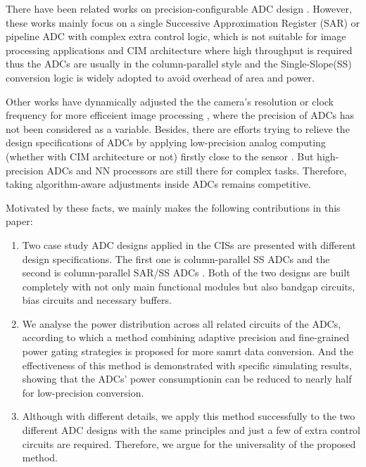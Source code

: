 \documentclass[conference]{IEEEtran}
\begin{document}

There have been related works on precision-configurable ADC design \cite{xia_10-bit_2006}\cite{zhu_06_2013}\cite{zhu_6--10-bit_2015}. However, these works mainly focus on a single Successive Approximation Register (SAR) or pipeline ADC with complex extra control logic,
which is not suitable for image processing applications and CIM architecture where high throughput is required thus the ADCs are usually in the column-parallel style and the Single-Slope(SS)
conversion logic is widely adopted to avoid overhead of area and power.

Other works have dynamically adjusted the the camera’s resolution or clock frequency for more efficeient image processing \cite{lubana_digital_2018}\cite{likamwa_energy_2013}, where the precision of ADCs has not been considered as a variable. 
Besides, there are efforts trying to relieve the design specifications of ADCs by applying low-precision analog computing (whether with CIM architecture or not) firstly close to the sensor \cite{likamwa_redeye_2016}\cite{chen_asp_2016}\cite{liu_ns-cim_2020}. 
But high-precision ADCs and NN processors are still there for complex tasks. Therefore, taking algorithm-aware adjustments inside ADCs remains competitive.

Motivated by these facts, we mainly makes the following contributions in this paper:

\begin{enumerate}[\IEEEsetlabelwidth{3)}]
	\item 
	Two case study ADC designs applied in the CISs are presented with different design specifications. 
	The first one is column-parallel SS ADCs \cite{snoeij_18v_2005}\cite{kleinfelder_10000_2001} and the second is column-parallel SAR/SS ADCs \cite{kim_area-efficient_2016}.
	Both of the two designs are built completely with not only main functional modules but also bandgap circuits, bias circuits and necessary buffers.
	\item 
	We analyse the power distribution across all related circuits of the ADCs, according to which a method combining adaptive precision and fine-grained power gating strategies is proposed
	for more samrt data conversion.  
	And the effectiveness of this method is demonstrated with specific simulating results, showing that the ADCs' power consumptionin can be reduced to nearly half for low-precision conversion.  
	\item 
	Although with different details, we apply this method successfully to the two different ADC designs with the same principles and just a few of extra control circuits are required.
	Therefore, we argue for the universality of the proposed method.
\end{enumerate} 
\end{document}
